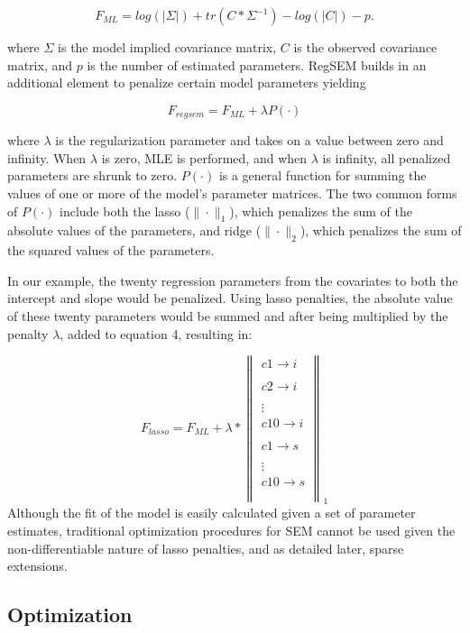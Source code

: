\documentclass[article]{jss}
\begin{document}
\[\tag{3}
F_{ML}=log(\left|\Sigma\right|)+tr(C*\Sigma^{-1})-log(\left|C\right|)- p.
\]

\noindent
where \(\Sigma\) is the model implied covariance matrix, \(C\) is the
observed covariance matrix, and \(p\) is the number of estimated
parameters. RegSEM builds in an additional element to penalize certain
model parameters yielding

\[\tag{4}
F_{regsem} = F_{ML} + \lambda P(\cdot)
\]

\noindent
where \(\lambda\) is the regularization parameter and takes on a value
between zero and infinity. When \(\lambda\) is zero, MLE is performed,
and when \(\lambda\) is infinity, all penalized parameters are shrunk to
zero. \(P(\cdot)\) is a general function for summing the values of one
or more of the model's parameter matrices. The two common forms of
\(P(\cdot)\) include both the lasso (\(\| \cdot \|_{1}\)), which
penalizes the sum of the absolute values of the parameters, and ridge
(\(\| \cdot \|_{2}\)), which penalizes the sum of the squared values of
the parameters.

In our example, the twenty regression parameters from the covariates to
both the intercept and slope would be penalized. Using lasso penalties,
the absolute value of these twenty parameters would be summed and after
being multiplied by the penalty \(\lambda\), added to equation 4,
resulting in:

\[\tag{5}
F_{lasso} = F_{ML} + \lambda * \left\|  \begin{matrix}  
c1 \xrightarrow[]{} i\\
c2\xrightarrow[]{}i\\
\vdots \\
c10\xrightarrow[]{}i\\
c1\xrightarrow[]{}s\\
\vdots \\
c10\xrightarrow[]{}s\\
\end{matrix}  \right\|_{1}
\] \noindent
Although the fit of the model is easily calculated given a set of
parameter estimates, traditional optimization procedures for SEM cannot
be used given the non-differentiable nature of lasso penalties, and as
detailed later, sparse extensions.

\subsection{Optimization}\label{optimization}
\end{document}

